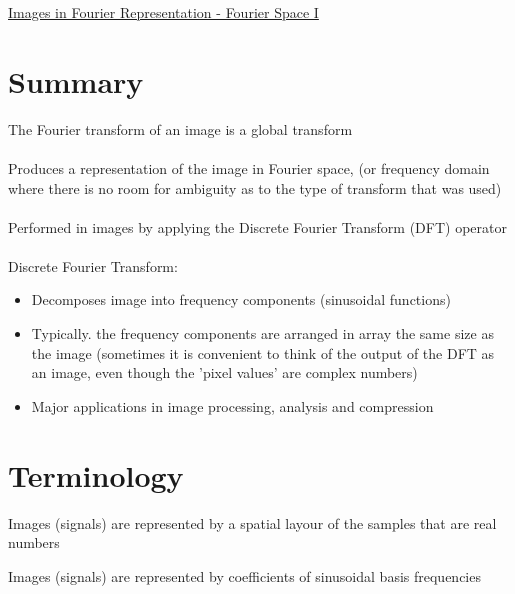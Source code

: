 \documentclass{article}[18pt]
\begin{document}
\begin{center}
\underline{\huge Images in Fourier Representation - Fourier Space I}
\end{center}
\section{Summary}
The Fourier transform of an image is a global transform\\
\\
Produces a representation of the image in Fourier space, (or frequency domain where there is no room for ambiguity as to the type of transform that was used)\\
\\
Performed in images by applying the Discrete Fourier Transform (DFT) operator\\
\\
Discrete Fourier Transform:
\begin{itemize}
	\item Decomposes image into frequency components (sinusoidal functions)
	\item Typically. the frequency components are arranged in array the same size as the image (sometimes it is convenient to think of the output of the DFT as an image, even though the 'pixel values' are complex numbers)
	\item Major applications in image processing, analysis and compression
\end{itemize}
\section{Terminology}
\begin{defin}
Images (signals) are represented by a spatial layour of the samples that are real numbers
\end{defin}

\begin{defin}
Images (signals) are represented by coefficients of sinusoidal basis frequencies  
\end{defin}
\end{document}
